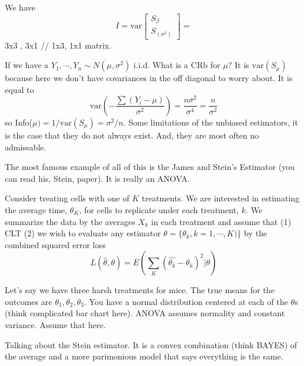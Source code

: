 \documentclass[letterpaper, 12pt]{article}
\theoremstyle{definition}
\theoremstyle{plain}
\newcommand{\var}{\text{var}}
\begin{document}
We have
\begin{equation}
I = \var 
\begin{bmatrix}
S_\beta \\ S_(\sigma^2)
\end{bmatrix}
=
\end{equation}
3x3 , 3x1 // 1x3, 1x1 matrix.

If we have a $Y_1, \cdots, Y_n \sim N(\mu, \sigma^2)$ i.i.d. What is a CRb for $\mu$? It is $\var(S_\mu)$ because here we don't have covariances in the off diagonal to worry about. It is equal to
\begin{equation}
\var(-\frac{\sum(Y_i - \mu)}{\sigma^2}) = \frac{n \sigma^2}{\sigma^4} = \frac{n}{\sigma^2}
\end{equation}
so Info($\mu) = 1/ \var(S_\mu) = \sigma^2 / n$. Some limitations of the unbiased estimators, it is the case that they do not always exist. And, they are most often no admissable.

The most famous example of all of this is the James and Stein's Estimator (you can read his, Stein, paper). It is really an ANOVA.

Consider treating cells with one of $K$ treatments. We are interested in estimating the average time, $\theta_K$, for cells to replicate under each treatment, $k$. We summarize the data by the averages $X_k$ in each treatment and assume that (1) CLT (2) we wish to evaluate any estimator $\theta = \{\theta_k, k = 1, \cdots, K) \}$ by the combined squared error loss
\begin{equation}
L(\hat{\theta}, \theta) = E( \sum_K (\hat{\theta_k} - \theta_k)^2 | \theta) 
\end{equation}

Let's say we have three harsh treatments for mice. The true means for the outcomes are $\theta_1, \theta_2, \theta_3$. You have a normal distribution centered at each of the $\theta$s (think complicated bar chart here). ANOVA assumes normality and constant variance. Assume that here.


Talking about the Stein estimator. It is a convex combination (think BAYES) of the average and a more parimonious model that says everything is the same.
\end{document}
